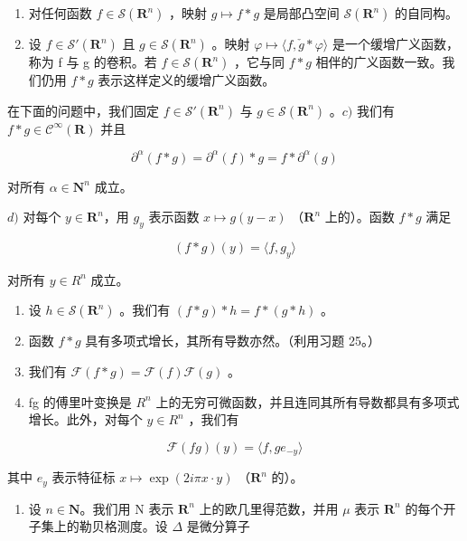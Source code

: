 \begin{enumerate}
\def\labelenumi{\alph{enumi})}
\item
  对任何函数 \(f \in \mathcal{S}(\mathbf{R}^n)\) ，映射 \(g \mapsto f * g\) 是局部凸空间 \(\mathcal{S}(\mathbf{R}^n)\) 的自同构。
\item
  设 \(f \in \mathcal{S}'(\mathbf{R}^{n})\) 且 \(g \in \mathcal{S}(\mathbf{R}^{n})\) 。映射 \(\varphi \mapsto \langle f, \check{g} * \varphi \rangle\) 是一个缓增广义函数，称为 f 与 g 的卷积。若 \(f \in \mathcal{S}(\mathbf{R}^{n})\) ，它与同 \(f * g\) 相伴的广义函数一致。我们仍用 \(f * g\) 表示这样定义的缓增广义函数。
\end{enumerate}

在下面的问题中，我们固定 \(f \in \mathcal{S}'(\mathbf{R}^n)\) 与 \(g \in \mathcal{S}(\mathbf{R}^n)\) 。\(c)\) 我们有 \(f * g \in \mathcal{C}^\infty(\mathbf{R})\) 并且

\[
\partial^ {\alpha} (f * g) = \partial^ {\alpha} (f) * g = f * \partial^ {\alpha} (g)
\]

对所有 \(\alpha\in\mathbf{N}^{n}\) 成立。

\(d)\) 对每个 \(y \in \mathbf{R}^n\)，用 \(g_y\) 表示函数 \(x \mapsto g(y - x)\) （\(\mathbf{R}^n\) 上的）。函数 \(f * g\) 满足

\[
(f * g) (y) = \langle f, g _ {y} \rangle
\]

对所有 \(y \in R^{n}\) 成立。

\begin{enumerate}
\def\labelenumi{\alph{enumi})}
\setcounter{enumi}{4}
\item
  设 \(h \in \mathcal{S}(\mathbf{R}^n)\) 。我们有 \((f*g)*h = f*(g*h)\) 。
\item
  函数 \(f*g\) 具有多项式增长，其所有导数亦然。（利用习题 25。）
\item
  我们有 \(\mathcal{F}(f*g) = \mathcal{F}(f)\mathcal{F}(g)\) 。
\item
  fg 的傅里叶变换是 \(R^{n}\) 上的无穷可微函数，并且连同其所有导数都具有多项式增长。此外，对每个 \(y \in R^{n}\) ，我们有
\end{enumerate}

\[
\mathcal {F} (f g) (y) = \langle f, g e _ {- y} \rangle
\]

其中 \(e_y\) 表示特征标 \(x \mapsto \exp(2i\pi x \cdot y)\) （\(\mathbf{R}^n\) 的）。

\begin{enumerate}
\def\labelenumi{\arabic{enumi})}
\setcounter{enumi}{26}
\tightlist
\item
  设 \(n \in \mathbf{N}\)。我们用 N 表示 \(\mathbf{R}^{n}\) 上的欧几里得范数，并用 \(\mu\) 表示 \(\mathbf{R}^{n}\) 的每个开子集上的勒贝格测度。设 \(\Delta\) 是微分算子
\end{enumerate}

